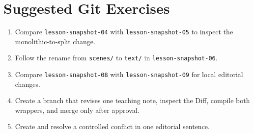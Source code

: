 \section{Suggested Git Exercises}
\begin{enumerate}
  \item Compare \texttt{lesson-snapshot-04} with
        \texttt{lesson-snapshot-05} to inspect the monolithic-to-split change.
  \item Follow the rename from \texttt{scenes/} to \texttt{text/} in
        \texttt{lesson-snapshot-06}.
  \item Compare \texttt{lesson-snapshot-08} with
        \texttt{lesson-snapshot-09} for local editorial changes.
  \item Create a branch that revises one teaching note, inspect the Diff,
        compile both wrappers, and merge only after approval.
  \item Create and resolve a controlled conflict in one editorial sentence.
\end{enumerate}
